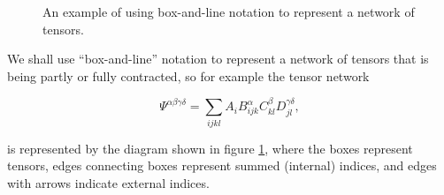 \documentclass{amsbook}
\theoremstyle{plain}
\theoremstyle{definition}
\theoremstyle{remark}
\begin{document}
\begin{figure}
\caption{An example of using box-and-line notation to represent a network of tensors.}
\label{fig:box-line-notation-introduced}
\end{figure}

We shall use ``box-and-line'' notation to represent a network of tensors that is being partly or fully contracted, so for example the tensor network

$$\Psi^{\alpha\beta\gamma\delta} = \sum_{ijkl} A_{i} B_{ijk}^\alpha C_{kl}^\beta D_{jl}^{\gamma\delta},$$

\noindent is represented by the diagram shown in figure \ref{fig:box-line-notation-introduced}, where the boxes represent tensors, edges connecting boxes represent summed (internal) indices, and edges with arrows indicate external indices.
\end{document}
